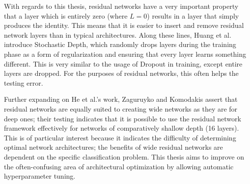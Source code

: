 With regards to this thesis, residual networks have a very important property that a layer which is entirely zero (where $L = 0$) results in a layer that simply produces the identity.
This means that it is easier to insert and remove residual network layers than in typical architectures.
Along these lines, Huang et al. \cite{huang2016deep} introduce Stochastic Depth, which randomly drops layers during the training phase as a form of regularization and ensuring that every layer learns something different.
This is very similar to the usage of Dropout in training, except entire layers are dropped.
For the purposes of residual networks, this often helps the testing error.

Further expanding on He et al.'s work, Zaguruyko and Komodakis \cite{zagoruyko2016wide} assert that residual networks are equally suited to creating wide networks as they are for deep ones; their testing indicates that it is possible to use the residual network framework effectively for networks of comparatively shallow depth (16 layers).
This is of particular interest because it indicates the difficulty of determining optimal network architectures; the benefits of wide residual networks are dependent on the specific classification problem.
This thesis aims to improve on the often-confusing area of architectural optimization by allowing automatic hyperparameter tuning.
